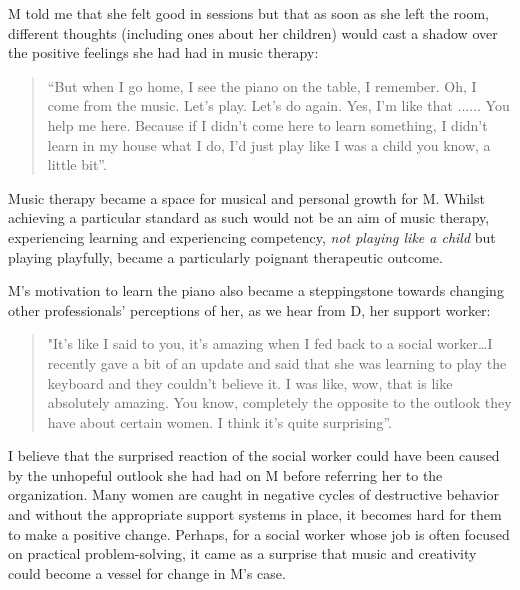 \documentclass[authordate, empirical, issue]{jote-new-article}
\begin{document}
M told me that she felt good in sessions but that as soon as she left the room, different thoughts (including ones about her children) would cast a shadow over the positive feelings she had had in music therapy:







\begin{quote}
  “But when I go home, I see the piano on the table, I remember. Oh, I come from the music. Let's play. Let's do again. Yes, I'm like that ...... You help me here. Because if I didn't come here to learn something, I didn't learn in my house what I do, I'd just play like I was a child you know, a little bit”.
\end{quote}







Music therapy became a space for musical and personal growth for M. Whilst achieving a particular standard as such would not be an aim of music therapy, experiencing learning and experiencing competency,\emph{ not playing like a child }but playing playfully, became a particularly poignant therapeutic outcome.







M's motivation to learn the piano also became a steppingstone towards changing other professionals' perceptions of her, as we hear from D, her support worker:







\begin{quote}
  "It's like I said to you, it's amazing when I fed back to a social worker…I recently gave a bit of an update and said that she was learning to play the keyboard and they couldn't believe it. I was like, wow, that is like absolutely amazing. You know, completely the opposite to the outlook they have about certain women. I think it's quite surprising”.
\end{quote}







I believe that the surprised reaction of the social worker could have been caused by the unhopeful outlook she had had on M before referring her to the organization. Many women are caught in negative cycles of destructive behavior and without the appropriate support systems in place, it becomes hard for them to make a positive change. Perhaps, for a social worker whose job is often focused on practical problem-solving, it came as a surprise that music and creativity could become a vessel for change in M's case.
\end{document}
